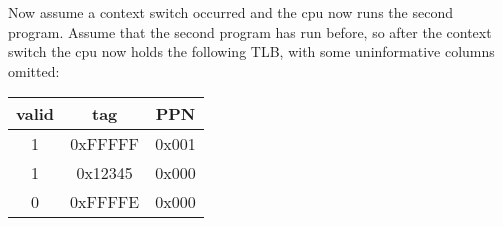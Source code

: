 \begin{blocksection}
\question 
Now assume a context switch occurred and the cpu now runs the second program. Assume that the second program has run before, so after the context switch the cpu now holds the following TLB, with some uninformative columns omitted:
\begin{center}
\begin{tabular}{ |c|c|c| }
 \hline
 valid & tag & PPN \\
 \hline
 1 & 0xFFFFF & 0x001 \\ 
 \hline
 1 & 0x12345 & 0x000 \\ 
 \hline
 0 & 0xFFFFE & 0x000 \\ 
 \hline
\end{tabular}
\end{center}

\end{blocksection}
